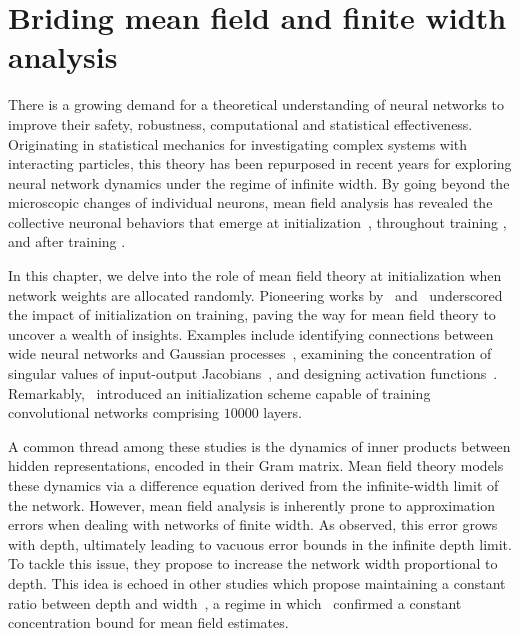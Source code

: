 

\chapter{Briding mean field and finite width analysis}\label{ch:bn_MF}


There is a growing demand for a theoretical understanding of neural networks to improve their safety, robustness, computational and statistical effectiveness. Originating in statistical mechanics for investigating complex systems with interacting particles, this theory has been repurposed in recent years for exploring neural network dynamics under the regime of infinite width. By going beyond the microscopic changes of individual neurons, mean field analysis has revealed the collective neuronal behaviors that emerge at initialization~\cite{pennington2018emergence,yang2018a,pennington2017nonlinear}, throughout training \cite{jacot2018neural,bach2021gradient,lee2019wide}, and after training \cite{chizat2020implicit,ba2019generalization}.

In this chapter, we delve into the role of mean field theory at initialization when network weights are allocated randomly. Pioneering works by~\citet{pmlrv9glorot10a} and~\citet{saxe2013exact} underscored the impact of initialization on training, paving the way for mean field theory to uncover a wealth of insights. Examples include identifying connections between wide neural networks and Gaussian processes~\cite{neal2012bayesian,matthews2018gaussian,jacot2018neural}, examining the concentration of singular values of input-output Jacobians~\cite{pennington2018emergence,feng2022rank}, and designing activation functions~\cite{klambauer2017self,ramachandran2017searching,li2022neural}. Remarkably,~\citet{xiao2018dynamical} introduced an initialization scheme capable of training convolutional networks comprising $10000$ layers.

A common thread among these studies is the dynamics of inner products between hidden representations, encoded in their Gram matrix. Mean field theory models these dynamics via a difference equation derived from the infinite-width limit of the network. However, mean field analysis is inherently prone to approximation errors when dealing with networks of finite width. As \citet{matthews2018gaussian} observed, this error grows with depth, ultimately leading to vacuous error bounds in the infinite depth limit. To tackle this issue,  they propose to increase the network width proportional to depth. This idea is echoed in other studies which propose maintaining a constant ratio between depth and width~\cite{hanin2019finite,li2021future}, a regime in which~\citet{hanin2022correlation} confirmed a constant concentration bound for mean field estimates.


